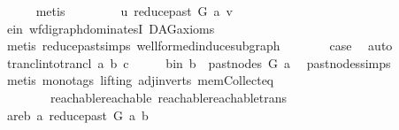 \begin{isabellebody}
\ \ \ \ \isamarkupfalse%
\ metis\ \ \isanewline
\isanewline
\ \ \isamarkupfalse%
\ \isamarkupfalse%
\ \ {\isachardoublequoteopen}u\ {\isasymrightarrow}\isactrlbsub reduce{\isacharunderscore}{\kern0pt}past\ G\ a\isactrlesub \ v{\isachardoublequoteclose}\ \isamarkupfalse%
\ e{\isacharunderscore}{\kern0pt}in{}\ wf{\isacharunderscore}{\kern0pt}digraph{\isachardot}{\kern0pt}dominatesI\ DAG{\isacharunderscore}{\kern0pt}axioms\isanewline
\ \ \ \ \isamarkupfalse%
\ {\isacharparenleft}{\kern0pt}metis\ reduce{\isacharunderscore}{\kern0pt}past{\isachardot}{\kern0pt}simps\ wellformed{\isacharunderscore}{\kern0pt}induce{\isacharunderscore}{\kern0pt}subgraph{\isacharparenright}{\kern0pt}\ \ \isanewline
\ \ \isamarkupfalse%
\ \isamarkupfalse%
\ {\isacharquery}{\kern0pt}case\ \isamarkupfalse%
\ auto\isanewline
{}\isamarkupfalse%
\isanewline
\ \ \isamarkupfalse%
\ {\isacharparenleft}{\kern0pt}trancl{\isacharunderscore}{\kern0pt}into{\isacharunderscore}{\kern0pt}trancl\ a{}\ b\ c{\isacharparenright}{\kern0pt}\isanewline
\ \ \isamarkupfalse%
\ \isamarkupfalse%
\ b{\isacharunderscore}{\kern0pt}in{\isacharcolon}{\kern0pt}\ {\isachardoublequoteopen}b\ {\isasymin}\ past{\isacharunderscore}{\kern0pt}nodes\ G\ a{\isachardoublequoteclose}\ \isamarkupfalse%
\ past{\isacharunderscore}{\kern0pt}nodes{\isachardot}{\kern0pt}simps\ \isanewline
\ \ \ \ \isamarkupfalse%
\ {\isacharparenleft}{\kern0pt}metis\ {\isacharparenleft}{\kern0pt}mono{\isacharunderscore}{\kern0pt}tags{\isacharcomma}{\kern0pt}\ lifting{\isacharparenright}{\kern0pt}\ adj{\isacharunderscore}{\kern0pt}in{\isacharunderscore}{\kern0pt}verts{\isacharparenleft}{\kern0pt}{}{\isacharparenright}{\kern0pt}\ mem{\isacharunderscore}{\kern0pt}Collect{\isacharunderscore}{\kern0pt}eq\isanewline
\ \ \ \ \ \ \ \ reachable{}{\isacharunderscore}{\kern0pt}reachable\ reachable{}{\isacharunderscore}{\kern0pt}reachable{\isacharunderscore}{\kern0pt}trans{\isacharparenright}{\kern0pt}\ \isanewline
\ \ \isamarkupfalse%
\ \isamarkupfalse%
\ a{}{\isacharunderscore}{\kern0pt}re{\isacharunderscore}{\kern0pt}b{\isacharcolon}{\kern0pt}\ {\isachardoublequoteopen}a{}\ {\isasymrightarrow}\isactrlsup {\isacharplus}{\kern0pt}\isactrlbsub reduce{\isacharunderscore}{\kern0pt}past\ G\ a\isactrlesub \ b{\isachardoublequoteclose}\ \isamarkupfalse%

\end{isabellebody}
